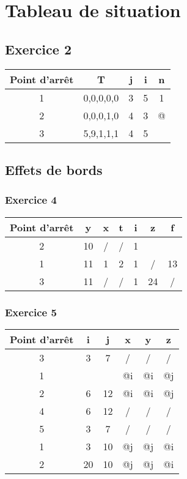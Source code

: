 \section{Tableau de situation}	
\subsection{Exercice 2}

\begin{center}
\begin{tabular}{c  |  c  c  c  c  }
\textbf{Point d'arrêt }& \textbf{T} & \textbf{j} & \textbf{i} &\textbf{n}\\
\hline
1 & 0,0,0,0,0 & 3 & 5 & 1\\
\hline
2 & 0,0,0,1,0 & 4 & 3 & @\\
\hline
3 & 5,9,1,1,1&4&5&\\
\hline
\end{tabular}
\end{center}
\newpage
\subsection{Effets de bords}
\subsubsection{Exercice 4}

\begin{center}
\begin{tabular}{c |  c  c  c  c  c  c  }
	\textbf{Point d'arrêt} & \textbf{y} & \textbf{x} & \textbf{t} & \textbf{i} & \textbf{z} & \textbf{f}\\
	\hline
	2 & 10 & / & / & 1 && \\
	\hline
	1 & 11 & 1 & 2 & 1 & / & 13\\
	\hline
	3 & 11 & / & / & 1 & 24 & /\\
	\hline
\end{tabular}
\end{center}
\newpage
\subsubsection{Exercice 5}

\begin{center}
\begin{tabular}{c |  c  c  c  c  c  }
	\textbf{Point d'arrêt} & \textbf{i} & \textbf{j} & \textbf{x} & \textbf{y} & \textbf{z}\\
	\hline
	3 & 3 & 7 &/ &/&/\\
	\hline
	1 & &&@i&@i&@j\\
	\hline
	2 & 6 & 12 & @i & @i & @j\\
	\hline
	4 & 6 & 12 & / & / & /\\
	\hline
	5 & 3 & 7 & / & / & / \\
	\hline
	1 & 3&10 &@j&@j&@i\\
	\hline
	2 & 20 & 10 & @j&@j&@i\\
	\hline
\end{tabular}
\end{center}
\newpage
